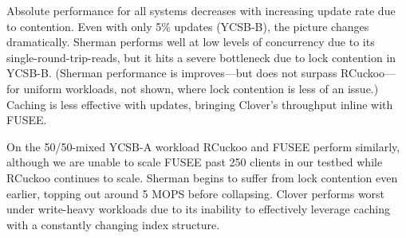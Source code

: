 Absolute performance for all systems decreases with increasing update
rate due to contention.  Even with only 5\% updates (YCSB-B), the
picture changes dramatically.  Sherman performs well at low levels of
concurrency due to its single-round-trip-reads, but it hits a severe
bottleneck due to lock contention in YCSB-B.  (Sherman performance is
improves---but does not surpass RCuckoo---for uniform workloads, not
shown, where lock contention is less of an issue.)
Caching is less effective with updates, bringing Clover's throughput inline with FUSEE.

On the 50/50-mixed YCSB-A workload RCuckoo and FUSEE perform
similarly, although we are unable to scale FUSEE past 250 clients in
our testbed while RCuckoo continues to scale.
Sherman begins to suffer from lock contention even earlier, topping
out around 5 MOPS before collapsing.  Clover performs worst under
write-heavy workloads due to its inability to effectively leverage
caching with a constantly changing index structure.


